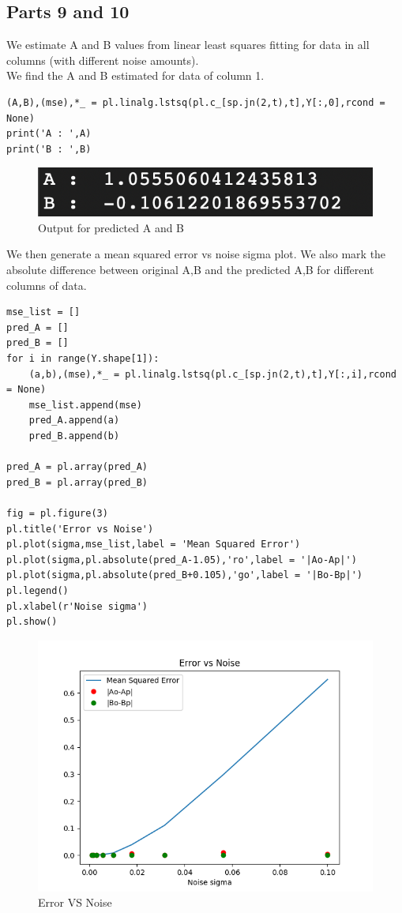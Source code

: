\documentclass[11pt, a4paper]{article}
\begin{document}
\subsection{Parts 9 and 10}
We estimate A and B values from linear least squares fitting for data in all columns (with different noise amounts).\\
We find the A and B estimated for data of column 1.
\begin{verbatim}
(A,B),(mse),*_ = pl.linalg.lstsq(pl.c_[sp.jn(2,t),t],Y[:,0],rcond = None)
print('A : ',A)
print('B : ',B)
\end{verbatim}

\begin{figure}[!htb]
   	\centering
   	\includegraphics[scale=0.5]{A_and_B.png}
   	\caption{Output for predicted A and B}
   	\label{fig:A_and_B}
\end{figure}

We then generate a  mean squared error vs noise sigma plot. We also mark the absolute difference between original A,B and the predicted A,B for different columns of data.
\begin{verbatim}
mse_list = []
pred_A = []
pred_B = []
for i in range(Y.shape[1]):
	(a,b),(mse),*_ = pl.linalg.lstsq(pl.c_[sp.jn(2,t),t],Y[:,i],rcond = None)
	mse_list.append(mse)
	pred_A.append(a)
	pred_B.append(b)

pred_A = pl.array(pred_A)
pred_B = pl.array(pred_B)

fig = pl.figure(3)
pl.title('Error vs Noise')
pl.plot(sigma,mse_list,label = 'Mean Squared Error')
pl.plot(sigma,pl.absolute(pred_A-1.05),'ro',label = '|Ao-Ap|')
pl.plot(sigma,pl.absolute(pred_B+0.105),'go',label = '|Bo-Bp|')
pl.legend()
pl.xlabel(r'Noise sigma')
pl.show()
\end{verbatim}

\begin{figure}[!htb]
   	\centering
   	\includegraphics[scale=0.5]{errorvsnoise.png}
   	\caption{Error VS Noise}
   	\label{fig:errorvsnoise}
\end{figure}
\end{document}
